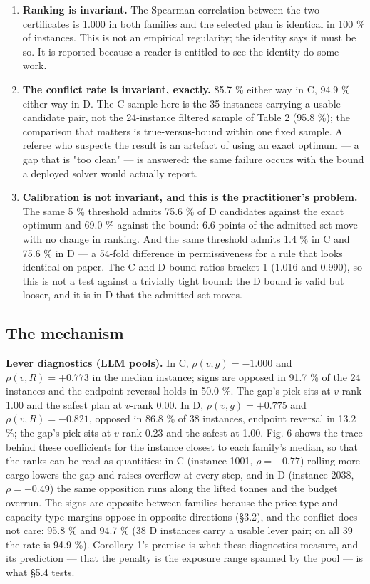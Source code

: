 \documentclass[preprint,12pt,letterpaper]{elsarticle}
\theoremstyle{definition}
\theoremstyle{plain}
\begin{document}
\begin{enumerate}
\item \textbf{Ranking is invariant.} The Spearman correlation between the two certificates is 1.000 in both families and the selected plan is identical in 100 \% of instances. This is not an empirical regularity; the identity says it must be so. It is reported because a reader is entitled to see the identity do some work.
\item \textbf{The conflict rate is invariant, exactly.} 85.7 \% either way in C, 94.9 \% either way in D. The C sample here is the 35 instances carrying a usable candidate pair, not the 24-instance filtered sample of Table 2 (95.8 \%); the comparison that matters is true-versus-bound within one fixed sample. A referee who suspects the result is an artefact of using an exact optimum --- a gap that is "too clean" --- is answered: the same failure occurs with the bound a deployed solver would actually report.
\item \textbf{Calibration is not invariant, and this is the practitioner's problem.} The same 5 \% threshold admits 75.6 \% of D candidates against the exact optimum and 69.0 \% against the bound: 6.6 points of the admitted set move with no change in ranking. And the same threshold admits 1.4 \% in C and 75.6 \% in D --- a 54-fold difference in permissiveness for a rule that looks identical on paper. The C and D bound ratios bracket 1 (1.016 and 0.990), so this is not a test against a trivially tight bound: the D bound is valid but looser, and it is in D that the admitted set moves.
\end{enumerate}

\subsection{The mechanism}

\textbf{Lever diagnostics (LLM pools).} In C, $\rho(v, g) = -1.000$ and $\rho(v, R) = +0.773$ in the median instance; signs are opposed in 91.7 \% of the 24 instances and the endpoint reversal holds in 50.0 \%. The gap's pick sits at $v$-rank 1.00 and the safest plan at $v$-rank 0.00. In D, $\rho(v, g) = +0.775$ and $\rho(v, R) = -0.821$, opposed in 86.8 \% of 38 instances, endpoint reversal in 13.2 \%; the gap's pick sits at $v$-rank 0.23 and the safest at 1.00. Fig. 6 shows the trace behind these coefficients for the instance closest to each family's median, so that the ranks can be read as quantities: in C (instance 1001, $\rho = -0.77$) rolling more cargo lowers the gap and raises overflow at every step, and in D (instance 2038, $\rho = -0.49$) the same opposition runs along the lifted tonnes and the budget overrun. The signs are opposite between families because the price-type and capacity-type margins oppose in opposite directions (\S 3.2), and the conflict does not care: 95.8 \% and 94.7 \% (38 D instances carry a usable lever pair; on all 39 the rate is 94.9 \%). Corollary 1's premise is what these diagnostics measure, and its prediction --- that the penalty is the exposure range spanned by the pool --- is what \S 5.4 tests.
\end{document}
